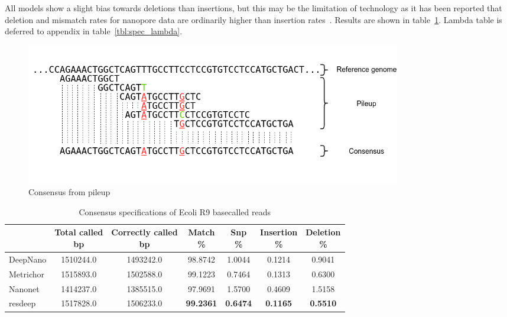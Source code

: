 \documentclass[runningheads,a4paper]{llncs}
\begin{document}
All models show a slight bias towards deletions than insertions, but this may be the limitation of technology as it has been reported that deletion and mismatch rates for nanopore data are ordinarily higher than insertion rates~\cite{sovic2016fast}. Results are shown in table~\ref{tbl:spec_ecoli}. Lambda table is deferred to appendix in table~\ref{tbl:spec_lambda}.

\begin{figure}[]
   \begin{center}
       \includegraphics[width=0.8\textwidth]{./imgs/consnesus.png}
       \caption{Consensus from pileup}
       \label{fg:consensus}
   \end{center}
\end{figure}

\begin{table}[]
	\caption{Consensus specifications of Ecoli R9 basecalled reads}
	\label{tbl:spec_ecoli}
	\centering
	\begin{tabular}{lcccccc}
		\toprule
		{} &  \thead{Total called\\\lbrack bp\rbrack} &  \thead{Correctly called\\\lbrack bp\rbrack} &  \thead{Match\\\%} &  \thead{Snp\\\%} &  \thead{Insertion\\\%} &  \thead{Deletion\\\%} \\
		\midrule
		DeepNano  &                  1510244.0 &                      1493242.0 &          98.8742 &         1.0044 &               0.1214 &              0.9041 \\
		Metrichor &                  1515893.0 &                      1502588.0 &          99.1223 &         0.7464 &               0.1313 &              0.6300 \\
		Nanonet   &                  1414237.0 &                      1385515.0 &          97.9691 &         1.5700 &               0.4609 &              1.5158 \\
		resdeep   &                  1517828.0 &                      1506233.0 &          \textbf{99.2361} &         \textbf{0.6474} &               \textbf{0.1165} &             \textbf{ 0.5510 }\\
		\bottomrule
	\end{tabular}
\end{table}
\end{document}
